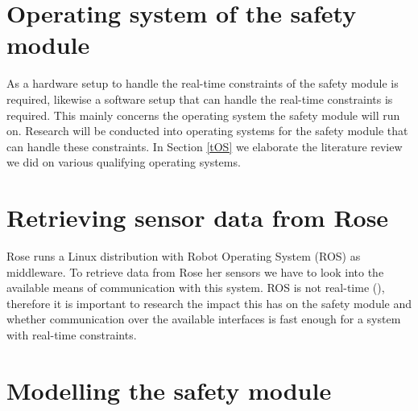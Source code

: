 \documentclass[12pt]{scrreprt}
\begin{document}
\section{Operating system of the safety module}
As a hardware setup to handle the real-time constraints of the safety module is required, likewise a software setup that can handle the real-time constraints is required. This mainly concerns the operating system the safety module will run on. Research will be conducted into operating systems for the safety module that can handle these constraints. In Section \ref{tOS} we elaborate the literature review we did on various qualifying operating systems.


\section{Retrieving sensor data from Rose}
\label{Retrieving sensor data from Rose}
Rose runs a Linux distribution with Robot Operating System (ROS) as middleware. To retrieve data from Rose her sensors we have to look into the available means of communication with this system. ROS is not real-time (\cite{why_is_ros_not_realtime}), therefore it is important to research the impact this has on the safety module and whether communication over the available interfaces is fast enough for a system with real-time constraints. %

\section{Modelling the safety module}
\label{Modelling the safety module}
\end{document}
